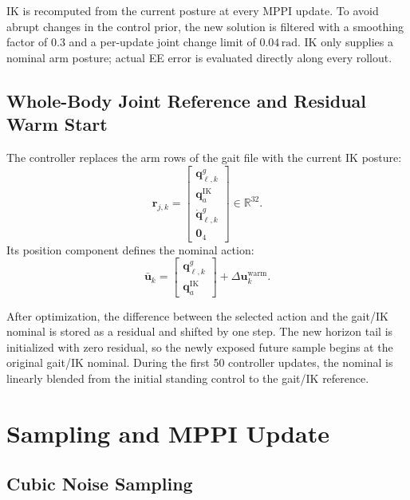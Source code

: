 \documentclass[11pt,a4paper]{article}
\newcommand{\R}{\mathbb{R}}
\begin{document}
IK is recomputed from the current posture at every MPPI update. To avoid
abrupt changes in the control prior, the new solution is filtered with a
smoothing factor of $0.3$ and a per-update joint change limit of
$0.04\,\mathrm{rad}$. IK only supplies a nominal arm posture; actual EE error
is evaluated directly along every rollout.

\subsection{Whole-Body Joint Reference and Residual Warm Start}

The controller replaces the arm rows of the gait file with the current IK
posture:
\begin{equation}
  \bm{r}_{j,k}=
  \begin{bmatrix}
    \bm{q}^{g}_{\ell,k}\\
    \bm{q}^{\mathrm{IK}}_a\\
    \dot{\bm{q}}^{g}_{\ell,k}\\
    \bm{0}_4
  \end{bmatrix}
  \in\R^{32}.
\end{equation}
Its position component defines the nominal action:
\begin{equation}
  \bar{\bm{u}}_k=
  \begin{bmatrix}
    \bm{q}^{g}_{\ell,k}\\
    \bm{q}^{\mathrm{IK}}_a
  \end{bmatrix}
  +\Delta\bm{u}^{\mathrm{warm}}_k.
\end{equation}

After optimization, the difference between the selected action and the
gait/IK nominal is stored as a residual and shifted by one step. The new
horizon tail is initialized with zero residual, so the newly exposed future
sample begins at the original gait/IK nominal. During the first 50 controller
updates, the nominal is linearly blended from the initial standing control to
the gait/IK reference.

\section{Sampling and MPPI Update}

\subsection{Cubic Noise Sampling}
\end{document}
